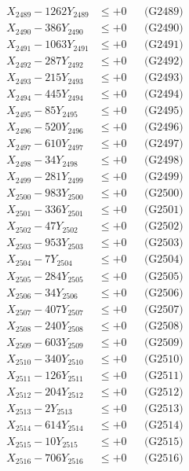 \documentclass[a4paper,10pt]{article}
\begin{document}
{\begin{align}
X_{2489} - 1262Y_{2489} &\leq +0 && \text{(G2489)} \\
X_{2490} - 386Y_{2490} &\leq +0 && \text{(G2490)} \\
\allowbreak
X_{2491} - 1063Y_{2491} &\leq +0 && \text{(G2491)} \\
X_{2492} - 287Y_{2492} &\leq +0 && \text{(G2492)} \\
X_{2493} - 215Y_{2493} &\leq +0 && \text{(G2493)} \\
X_{2494} - 445Y_{2494} &\leq +0 && \text{(G2494)} \\
X_{2495} - 85Y_{2495} &\leq +0 && \text{(G2495)} \\
X_{2496} - 520Y_{2496} &\leq +0 && \text{(G2496)} \\
X_{2497} - 610Y_{2497} &\leq +0 && \text{(G2497)} \\
X_{2498} - 34Y_{2498} &\leq +0 && \text{(G2498)} \\
X_{2499} - 281Y_{2499} &\leq +0 && \text{(G2499)} \\
X_{2500} - 983Y_{2500} &\leq +0 && \text{(G2500)} \\
\allowbreak
X_{2501} - 336Y_{2501} &\leq +0 && \text{(G2501)} \\
X_{2502} - 47Y_{2502} &\leq +0 && \text{(G2502)} \\
X_{2503} - 953Y_{2503} &\leq +0 && \text{(G2503)} \\
X_{2504} - 7Y_{2504} &\leq +0 && \text{(G2504)} \\
X_{2505} - 284Y_{2505} &\leq +0 && \text{(G2505)} \\
X_{2506} - 34Y_{2506} &\leq +0 && \text{(G2506)} \\
X_{2507} - 407Y_{2507} &\leq +0 && \text{(G2507)} \\
X_{2508} - 240Y_{2508} &\leq +0 && \text{(G2508)} \\
X_{2509} - 603Y_{2509} &\leq +0 && \text{(G2509)} \\
X_{2510} - 340Y_{2510} &\leq +0 && \text{(G2510)} \\
\allowbreak
X_{2511} - 126Y_{2511} &\leq +0 && \text{(G2511)} \\
X_{2512} - 204Y_{2512} &\leq +0 && \text{(G2512)} \\
X_{2513} - 2Y_{2513} &\leq +0 && \text{(G2513)} \\
X_{2514} - 614Y_{2514} &\leq +0 && \text{(G2514)} \\
X_{2515} - 10Y_{2515} &\leq +0 && \text{(G2515)} \\
X_{2516} - 706Y_{2516} &\leq +0 && \text{(G2516)} \\

\end{align}}
\end{document}
